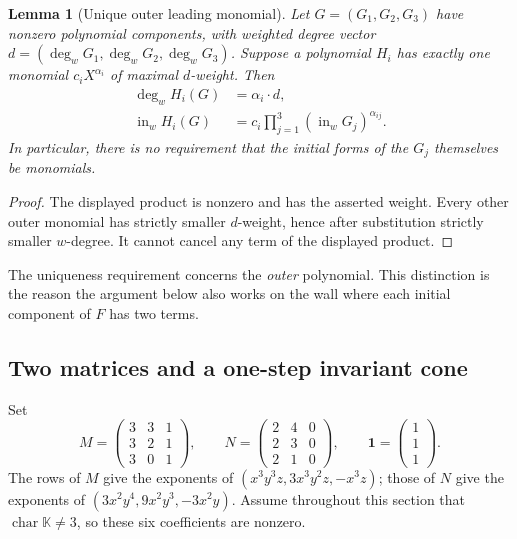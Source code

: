 \documentclass[11pt,a4paper]{article}
\numberwithin{equation}{section}
\newtheorem{lemma}[theorem]{Lemma}
\theoremstyle{definition}
\theoremstyle{remark}
\newcommand{\K}{\mathbb K}
\newcommand{\one}{\mathbf 1}
\newcommand{\dd}{\operatorname{deg}}
\newcommand{\init}{\operatorname{in}}
\DeclareMathOperator{\charac}{char}
\begin{document}
\begin{lemma}[Unique outer leading monomial]\label{kmd:lem:composition}
Let $G=(G_1,G_2,G_3)$ have nonzero polynomial components, with weighted
degree vector $d=(\dd_wG_1,\dd_wG_2,\dd_wG_3)$. Suppose a polynomial
$H_i$ has exactly one monomial $c_iX^{\alpha_i}$ of maximal
$d$-weight. Then
\begin{align*}
 \dd_w H_i(G)&=\alpha_i\cdot d,\\
 \init_w H_i(G)&=c_i\prod_{j=1}^3(\init_wG_j)^{\alpha_{ij}}.
\end{align*}
In particular, there is no requirement that the initial forms of the
$G_j$ themselves be monomials.
\end{lemma}
\begin{proof}
The displayed product is nonzero and has the asserted weight. Every
other outer monomial has strictly smaller $d$-weight, hence after
substitution strictly smaller $w$-degree. It cannot cancel any term
of the displayed product.
\end{proof}

The uniqueness requirement concerns the \emph{outer} polynomial.
This distinction is the reason the argument below also works on the
wall where each initial component of $F$ has two terms.

\subsection{Two matrices and a one-step invariant cone}
Set
\begin{equation}
 M=\begin{pmatrix}3&3&1\\3&2&1\\3&0&1\end{pmatrix},\qquad
 N=\begin{pmatrix}2&4&0\\2&3&0\\2&1&0\end{pmatrix},\qquad
 \one=\begin{pmatrix}1\\1\\1\end{pmatrix}.
 \label{kmd:eq:MN}
\end{equation}
The rows of $M$ give the exponents of
$(x^3y^3z,3x^3y^2z,-x^3z)$; those of $N$ give the exponents of
$(3x^2y^4,9x^2y^3,-3x^2y)$. Assume throughout this section that
$\charac\K\ne3$, so these six coefficients are nonzero.
\end{document}
